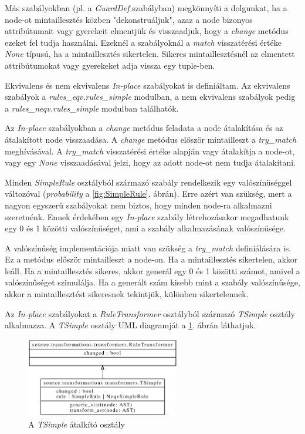 Más szabályokban (pl. a \emph{GuardDef} szabályban) megkönnyíti a dolgunkat,
ha a node-ot mintaillesztés közben "dekonstruáljuk", 
azaz a node bizonyos attribútumait vagy gyerekeit elmentjük és visszaadjuk,
hogy a \emph{change} metódus ezeket fel tudja használni.
Ezeknél a szabályoknál a \emph{match} visszatérési értéke \emph{None} típusú,
ha a mintaillesztés sikertelen.
Sikeres mintaillesztésnél az elmentett attribútumokat vagy gyerekeket adja vissza
egy tuple-ben.

Ekvivalens és nem ekvivalens \emph{In-place} szabályokat is definiáltam.
Az ekvivalens szabályok
a \emph{rules\_eqv.rules\_simple} modulban,
a nem ekvivalens szabályok pedig
a \emph{rules\_neqv.rules\_simple} modulban
találhatók.

Az \emph{In-place} szabályokban a \emph{change} metódus feladata a node átalakítása
és az átalakított node visszaadása.
A \emph{change} metódus először mintailleszt a \emph{try\_match} meghívásával.
A \emph{try\_match} visszatérési értéke alapján vagy átalakítja a node-ot,
vagy egy \emph{None} visszaadásával jelzi, hogy az adott node-ot nem tudja átalakítani.

Minden \emph{SimpleRule} osztályból származó szabály rendelkezik egy valószínüséggel változóval
(\emph{probability} a \ref{fig:SimpleRule}. ábrán).
Erre azért van szükség, mert a nagyon egyszerű szabályokat nem biztos,
hogy minden node-ra alkalmazni szeretnénk.
Ennek érdekében egy \emph{In-place} szabály létrehozásakor megadhatunk
egy 0 és 1 közötti valószínűséget, ami a szabály alkalmazásának valószínűsége.

A valószínűség implementációja miatt van szükség a \emph{try\_match} definiálására is.
Ez a metódus először mintailleszt a node-on.
Ha a mintaillesztés sikertelen, akkor leáll.
Ha a mintaillesztés sikeres,
akkor generál egy 0 és 1 közötti számot,
amivel a valószínűséget szimulálja.
Ha a generált szám kisebb mint a szabály valószínűsége,
akkor a mintaillesztést sikeresnek tekintjük, különben sikertelennek.

Az \emph{In-place} szabályokat
a \emph{RuleTransformer} osztályból származó \emph{TSimple} osztály alkalmazza.
A \emph{TSimple} osztály UML diagramját a \ref{fig:TSimple}. ábrán láthatjuk.

\begin{figure}[H]
	\centering
	\includegraphics[width=0.6\textwidth]{images/uml/TSimple.eps}
	\caption{A \emph{TSimple} átalkító osztály}
	\label{fig:TSimple}
\end{figure}

